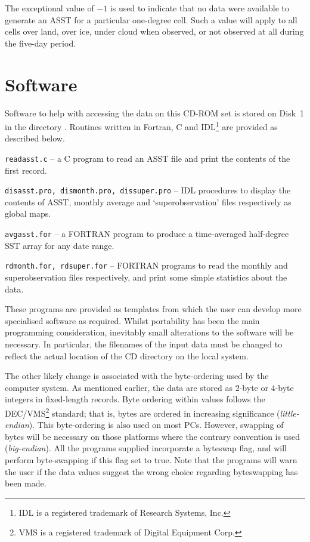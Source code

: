 The exceptional value of $-1$ is used to indicate that no data were 
available to generate an ASST for a particular one-degree cell.
Such a value will apply to all cells over land, over ice, under cloud
when observed, or not observed at all during the five-day period.


\clearpage


\section{Software }
\label{sec:soft}

Software to help with accessing the data on this  CD-ROM set 
is stored on Disk~1 in the directory .
Routines written in Fortran, C and 
IDL\footnote{IDL is a registered trademark of Research Systems, Inc.} are
provided as described below.

\begin{description}
\item{\tt readasst.c}  -- a C program to read an ASST file 
and print the contents of the first record. 

\item {\tt disasst.pro, dismonth.pro, dissuper.pro}  -- IDL procedures
to display the contents of ASST, monthly average and `superobservation' files 
respectively as global maps.

\item{\tt avgasst.for}  -- a FORTRAN program to produce a time-averaged
half-degree SST array for any date range.

\item{\tt rdmonth.for, rdsuper.for}   -- FORTRAN programs to read the
monthly and superobservation files respectively, and print some simple 
statistics about the data.
\end{description}

These programs are provided as templates from which the user can develop
more specialised software as required.
Whilst portability has been the main programming consideration,
inevitably small alterations to the software will be necessary.
In particular, the filenames of the input data must be 
changed to reflect the actual location of the CD directory 
on the local system.

The other likely change is associated with the byte-ordering used
by the computer system.
As mentioned earlier, the data are stored as 2-byte or 4-byte integers
in fixed-length records.
Byte ordering within values follows the 
DEC/VMS\footnote{VMS is a registered trademark of Digital Equipment Corp.}
standard; that is, bytes are ordered in increasing significance  
({\sl little-endian\/}).
This byte-ordering is also used on most PCs.
However, swapping of bytes will be necessary on those platforms 
where the contrary convention is used ({\sl big-endian}).
All the programs supplied incorporate a byteswap flag, and will perform
byte-swapping if this flag set to true.
Note that the programs will warn the user if the data values suggest the wrong 
choice regarding byteswapping has been made.

